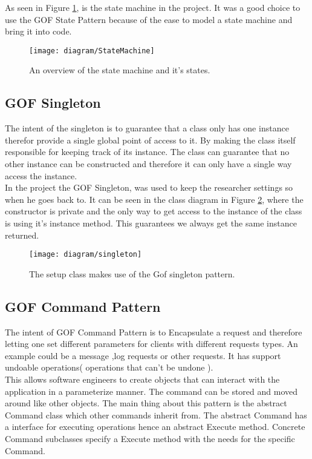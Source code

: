 As seen in Figure \ref{fig:statemachine}, is the state machine in the project. It was a good choice to use the GOF State Pattern because of the ease to model a state machine and bring it into code. 

\begin{figure}[h]
	\centering
	\texttt{[image: diagram/StateMachine]}
	\caption{An overview of the state machine and it's states.}
	\label{fig:statemachine}
\end{figure}

\subsection{GOF Singleton}
The intent of the singleton is to guarantee that a class only has one instance therefor provide a single global point of access to it. By making the class itself responsible for keeping track of its instance. The class can guarantee that no other instance can be constructed and therefore it can only have a single way access the instance.
\\
In the project the GOF Singleton, was used to keep the researcher settings so when he goes back to. It can be seen in the class diagram in Figure \ref{fig:singleton}, where the constructor is private and the only way to get access to the instance of the class is using it's instance method. This guarantees we always get the same instance returned.

\begin{figure}[h]
	\centering
	\texttt{[image: diagram/singleton]}
	\caption[Gof Singleton]{The setup class makes use of the Gof singleton pattern. }
	\label{fig:singleton}
\end{figure}

\subsection{GOF Command Pattern}
The intent of GOF Command Pattern is to Encapsulate a request and therefore letting one set different parameters for clients with different requests types. An example could be a message ,log requests or other requests. It has support undoable operations( operations that can't be undone ).\\

This allows software engineers to create objects that can interact with the application in a parameterize manner. The command can be stored and moved around like other objects. The main thing about this pattern is the abstract Command class which other commands inherit from. The abstract Command has a interface for executing operations hence an abstract Execute method. Concrete Command subclasses specify a Execute method with the needs for the specific Command. \\
 

